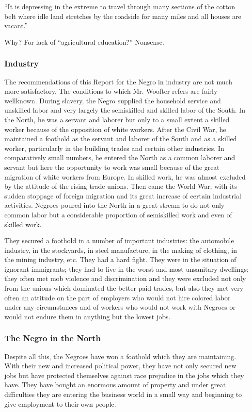 \documentclass[letterpaper,10pt,english]{jupyterBook}
\begin{document}
\sphinxAtStartPar
“It is depressing in the extreme to travel through many sections of the cotton belt where idle land stretches by the roadside for many miles and all houses are vacant.”

\sphinxAtStartPar
Why? For lack of “agricultural education?” Nonsense.


\subsubsection{Industry}
\label{\detokenize{Volumes/38/03/woofterism:industry}}
\sphinxAtStartPar
The recommendations of this Report for the Negro in industry are not much more satisfactory. The conditions to which Mr. Woofter refers are fairly well\sphinxhyphen{}known. During slavery, the Negro supplied the household service and unskilled labor and very largely the semi\sphinxhyphen{}skilled and skilled labor of the South. In the North, he was a servant and laborer but only to a small extent a skilled worker because of the opposition of white workers. After the Civil War, he maintained a foothold as the servant and laborer of the South and as a skilled worker, particularly in the building trades and certain other industries. In comparatively small numbers, he entered the North as a common laborer and servant but here the opportunity to work was small because of the great migration of white workers from Europe. In skilled work, he was almost excluded by the attitude of the rising trade unions. Then came the World War, with its sudden stoppage of foreign migration and its great increase of certain industrial activities. Negroes poured into the North in a great stream to do not only common labor but a considerable proportion of semiskilled work and even of skilled work.

\sphinxAtStartPar
They secured a foothold in a number of important industries: the automobile industry, in the stockyards, in steel manufacture, in the making of clothing, in the mining industry, etc. They had a hard fight. They were in the situation of ignorant immigrants; they had to live in the worst and most unsanitary dwellings; they often met mob violence and discrimination and they were excluded not only from the unions which dominated the better paid trades, but also they met very often an attitude on the part of employers who would not hire colored labor under any circumstances and of workers who would not work with Negroes or would not endure them in anything but the lowest jobs.


\subsubsection{The Negro in the North}
\label{\detokenize{Volumes/38/03/woofterism:the-negro-in-the-north}}
\sphinxAtStartPar
Despite all this, the Negroes have won a foothold which they are maintaining. With their new and increased political power, they have not only secured new jobs but have protected themselves against race prejudice in the jobs which they have. They have bought an enormous amount of property and under great difficulties they are entering the business world in a small way and beginning to give employment to their own people.
\end{document}
